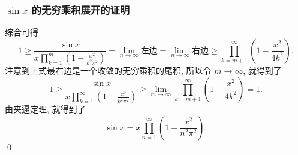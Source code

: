 
\begin{frame}
\frametitle{$\sin x$ 的无穷乘积展开的证明}

综合可得
\[
1 \geqslant \frac{\sin x}{x \prod\limits_{k=1}^m \left( 1 - \frac{x^2}{k^2 \pi^2} \right)} = \lim_{n \to \infty} \text{左边} = \lim_{n \to \infty} \text{右边} \geqslant \prod_{k=m+1}^\infty \left( 1 - \frac{x^2}{4 k^2} \right).
\]
注意到上式最右边是一个收敛的无穷乘积的尾积, 所以令 $m \to \infty$, 就得到了
\[
1 \geqslant \frac{\sin x}{x \prod\limits_{k=1}^\infty \left( 1 - \frac{x^2}{k^2 \pi^2} \right)} \geqslant \lim_{m \to \infty} \prod_{k=m+1}^\infty \left( 1 - \frac{x^2}{4 k^2} \right) = 1.
\]
由夹逼定理, 就得到了
\[
\sin x = x \prod_{n=1}^\infty \left( 1 - \frac{x^2}{n^2 \pi^2} \right).
\]
\qed

\end{frame}



